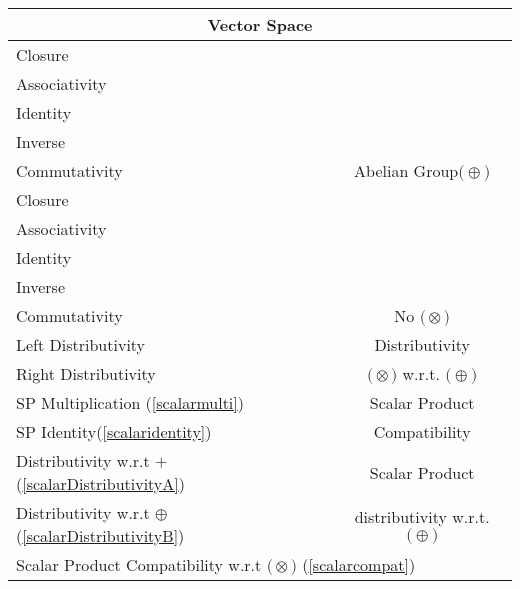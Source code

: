 \documentclass[a4paper,12pt]{scrartcl}    %
\newcommand{\OpA}{\otimes}
\newcommand{\OpB}{\oplus}
\begin{document}
\begin{minipage}[c]{0,5\textwidth}

\begin{tabular}{|l|c|} %
  \hline
  \multicolumn{2}{c}{\cellcolor{green!25}Vector Space} \\
  \hline
    \cellcolor{blue!25} \footnotesize Closure& \cellcolor{yellow!25}  \\
    \cellcolor{blue!25} \footnotesize Associativity& \cellcolor{yellow!25}  \\
    \cellcolor{blue!25} \footnotesize Identity& \cellcolor{yellow!25} \\
    \cellcolor{blue!25} \footnotesize Inverse& \cellcolor{yellow!25} \\
    \cellcolor{blue!25} \footnotesize Commutativity& \multirow{-5}{*}{\tiny\cellcolor{yellow!25}Abelian Group$\big(\OpB\big)$} \\
   \hline
    \cellcolor{red!25} \footnotesize Closure& \cellcolor{red!25}  \\
    \cellcolor{red!25} \footnotesize Associativity& \cellcolor{red!25}  \\
    \cellcolor{red!25} \footnotesize Identity& \cellcolor{red!25} \\
    \cellcolor{red!25} \footnotesize Inverse& \cellcolor{red!25} \\
    \cellcolor{red!25} \footnotesize Commutativity& \multirow{-5}{*}{\tiny\cellcolor{red!25} No $\big(\OpA\big)$} \\
  \hline
  	\cellcolor{red!25} \footnotesize Left Distributivity&  \tiny\cellcolor{red!25}Distributivity\\
    \cellcolor{red!25} \footnotesize Right Distributivity & \tiny\cellcolor{red!25} $\big(\OpA\big)$ w.r.t. $\big(\OpB\big)$  \\
   \hline
  \hline
     \cellcolor{blue!25} \footnotesize SP Multiplication (\ref{scalarmulti})&  \tiny\cellcolor{yellow!25}Scalar Product\\
    \cellcolor{blue!25} \footnotesize SP Identity(\ref{scalaridentity}) & \tiny\cellcolor{yellow!25} Compatibility  \\
   \hline 
    \cellcolor{blue!25} \footnotesize Distributivity w.r.t $+$ (\ref{scalarDistributivityA})&  \tiny\cellcolor{yellow!25}Scalar Product\\
    \cellcolor{blue!25} \footnotesize Distributivity w.r.t $\OpB$ (\ref{scalarDistributivityB}) & \tiny\cellcolor{yellow!25} distributivity w.r.t. $\big(\OpB\big)$  \\
   \hline
    \multicolumn{2}{l}{\footnotesize \cellcolor{red!25} Scalar Product Compatibility w.r.t  $\big(\OpA\big)$ (\ref{scalarcompat})}\\
   \hline
\end{tabular}


\end{minipage}
\end{document}
